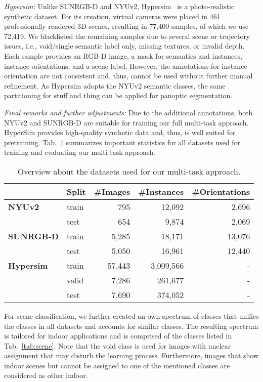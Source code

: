 \documentclass[conference]{IEEEtran}
\begin{document}
\textit{Hypersim:} \enspace Unlike SUNRGB-D and NYUv2, Hypersim~\cite{hypersim-iccv2021} is a photo-realistic synthetic dataset.
For its creation, virtual cameras were placed in 461 professionally rendered 3D scenes, resulting in 77,400 samples, of which we use 72,419.
We blacklisted the remaining samples due to several scene or trajectory issues, i.e., void/single semantic label only, missing textures, or invalid depth.
Each sample provides an \mbox{RGB-D} image, a mask for semantics and instances, instance orientations, and a scene label.
However, the annotations for instance orientation are not consistent and, thus, cannot be used without further manual refinement.
As Hypersim adopts the NYUv2 semantic classes, the same partitioning for stuff and thing can be applied for panoptic segmentation.


\textit{Final remarks and further adjustments:} \enspace Due to the additional annotations, both NYUv2 and SUNRGB-D are suitable for training our full multi-task approach.
HyperSim provides high-quality synthetic data and, thus, is well suited for pretraining.
Tab.~\ref{tab:dataset} summarizes important statistics for all datasets used for training and evaluating our multi-task approach.
\begin{table}[!t]
\caption{
    Overview about the datasets used for our multi-task approach.
}
\scriptsize
\label{tab:dataset}
\centering
\vspace{-2.5mm}
\begin{tabular}{@{}llrrr@{}}
         \toprule
         & \textbf{Split} & \textbf{\#Images} & \textbf{\#Instances}    & \textbf{\#Orientations} \\ \midrule
\textbf{NYUv2}    & train & 795      & 12,092    & 2,696         \\
         & test  & 654      & 9,874    & 2,069         \\ \midrule \textbf{SUNRGB-D}  & train & 5,285    & 18,171    & 13,076       \\
         & test  & 5,050     & 16,961     & 12,440        \\ \midrule \addlinespace[.5em]
\textbf{Hypersim} & train & 57,443   & 3,009,566 & -             \\
         & valid & 7,286    & 261,677 & -             \\
         & test  & 7,690     & 374,052  & -             \\ \bottomrule
\end{tabular}
\vspace{-3.5mm}
\end{table}
For scene classification, we further created an own spectrum of classes that unifies the classes in all datasets and accounts for similar classes. 
The resulting spectrum is tailored for indoor applications and is comprised of the classes listed in Tab.~\ref{tab:scene}.
Note that the void class is used for images with unclear assignment that may disturb the learning process. 
Furthermore, images that show indoor scenes but cannot be assigned to one of the mentioned classes are considered as other indoor.
\end{document}
